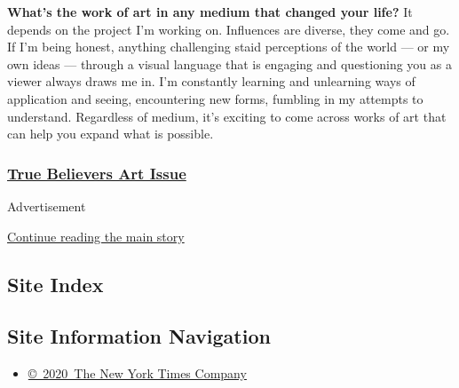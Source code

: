 \textbf{What's the work of art in any medium that changed your life?} It
depends on the project I'm working on. Influences are diverse, they come
and go. If I'm being honest, anything challenging staid perceptions of
the world --- or my own ideas --- through a visual language that is
engaging and questioning you as a viewer always draws me in. I'm
constantly learning and unlearning ways of application and seeing,
encountering new forms, fumbling in my attempts to understand.
Regardless of medium, it's exciting to come across works of art that can
help you expand what is possible.

\hypertarget{true-believers-art-issue}{%
\subsubsection{\texorpdfstring{\href{https://www.nytimes.com/issue/t-magazine/2020/07/02/true-believers-art-issue}{True
Believers Art
Issue}}{True Believers Art Issue}}\label{true-believers-art-issue}}

Advertisement

\protect\hyperlink{after-bottom}{Continue reading the main story}

\hypertarget{site-index}{%
\subsection{Site Index}\label{site-index}}

\hypertarget{site-information-navigation}{%
\subsection{Site Information
Navigation}\label{site-information-navigation}}

\begin{itemize}
\tightlist
\item
  \href{https://help.nytimes.com/hc/en-us/articles/115014792127-Copyright-notice}{©~2020~The
  New York Times Company}
\end{itemize}

